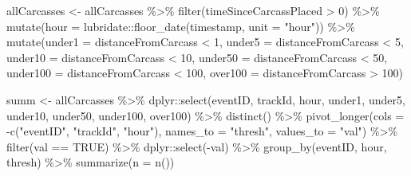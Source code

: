 \documentclass[
]{article}
\newenvironment{Shaded}{\begin{snugshade}}{\end{snugshade}}
\newcommand{\AttributeTok}[1]{\textcolor[rgb]{0.77,0.63,0.00}{#1}}
\newcommand{\ConstantTok}[1]{\textcolor[rgb]{0.00,0.00,0.00}{#1}}
\newcommand{\DecValTok}[1]{\textcolor[rgb]{0.00,0.00,0.81}{#1}}
\newcommand{\FunctionTok}[1]{\textcolor[rgb]{0.00,0.00,0.00}{#1}}
\newcommand{\NormalTok}[1]{#1}
\newcommand{\OtherTok}[1]{\textcolor[rgb]{0.56,0.35,0.01}{#1}}
\newcommand{\SpecialCharTok}[1]{\textcolor[rgb]{0.00,0.00,0.00}{#1}}
\newcommand{\StringTok}[1]{\textcolor[rgb]{0.31,0.60,0.02}{#1}}
\begin{document}
\begin{Shaded}
\begin{Highlighting}[]
\NormalTok{allCarcasses }\OtherTok{\textless{}{-}}\NormalTok{ allCarcasses }\SpecialCharTok{\%\textgreater{}\%}
  \FunctionTok{filter}\NormalTok{(timeSinceCarcassPlaced }\SpecialCharTok{\textgreater{}} \DecValTok{0}\NormalTok{) }\SpecialCharTok{\%\textgreater{}\%}
  \FunctionTok{mutate}\NormalTok{(}\AttributeTok{hour =}\NormalTok{ lubridate}\SpecialCharTok{::}\FunctionTok{floor\_date}\NormalTok{(timestamp, }\AttributeTok{unit =} \StringTok{"hour"}\NormalTok{)) }\SpecialCharTok{\%\textgreater{}\%}
  \FunctionTok{mutate}\NormalTok{(}\AttributeTok{under1 =}\NormalTok{ distanceFromCarcass }\SpecialCharTok{\textless{}} \DecValTok{1}\NormalTok{,}
         \AttributeTok{under5 =}\NormalTok{ distanceFromCarcass }\SpecialCharTok{\textless{}} \DecValTok{5}\NormalTok{,}
         \AttributeTok{under10 =}\NormalTok{ distanceFromCarcass }\SpecialCharTok{\textless{}} \DecValTok{10}\NormalTok{,}
         \AttributeTok{under50 =}\NormalTok{ distanceFromCarcass }\SpecialCharTok{\textless{}} \DecValTok{50}\NormalTok{,}
         \AttributeTok{under100 =}\NormalTok{ distanceFromCarcass }\SpecialCharTok{\textless{}} \DecValTok{100}\NormalTok{,}
         \AttributeTok{over100 =}\NormalTok{ distanceFromCarcass }\SpecialCharTok{\textgreater{}} \DecValTok{100}\NormalTok{)}

\NormalTok{summ }\OtherTok{\textless{}{-}}\NormalTok{ allCarcasses }\SpecialCharTok{\%\textgreater{}\%}
\NormalTok{  dplyr}\SpecialCharTok{::}\FunctionTok{select}\NormalTok{(eventID, trackId, hour, under1, under5, under10, under50, under100, over100) }\SpecialCharTok{\%\textgreater{}\%}
  \FunctionTok{distinct}\NormalTok{() }\SpecialCharTok{\%\textgreater{}\%}
  \FunctionTok{pivot\_longer}\NormalTok{(}\AttributeTok{cols =} \SpecialCharTok{{-}}\FunctionTok{c}\NormalTok{(}\StringTok{"eventID"}\NormalTok{, }\StringTok{"trackId"}\NormalTok{, }\StringTok{"hour"}\NormalTok{), }\AttributeTok{names\_to =} \StringTok{"thresh"}\NormalTok{, }\AttributeTok{values\_to =} \StringTok{"val"}\NormalTok{) }\SpecialCharTok{\%\textgreater{}\%}
  \FunctionTok{filter}\NormalTok{(val }\SpecialCharTok{==} \ConstantTok{TRUE}\NormalTok{) }\SpecialCharTok{\%\textgreater{}\%}
\NormalTok{  dplyr}\SpecialCharTok{::}\FunctionTok{select}\NormalTok{(}\SpecialCharTok{{-}}\NormalTok{val) }\SpecialCharTok{\%\textgreater{}\%}
  \FunctionTok{group\_by}\NormalTok{(eventID, hour, thresh) }\SpecialCharTok{\%\textgreater{}\%}
  \FunctionTok{summarize}\NormalTok{(}\AttributeTok{n =} \FunctionTok{n}\NormalTok{())}
\end{Highlighting}
\end{Shaded}
\end{document}

